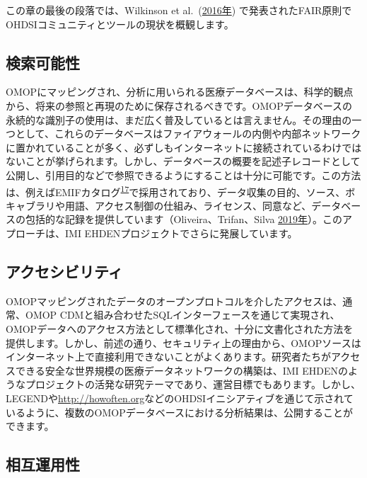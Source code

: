\documentclass[
  11pt]{book}
\theoremstyle{definition}
\theoremstyle{definition}
\theoremstyle{definition}
\theoremstyle{definition}
\theoremstyle{remark}
\begin{document}
この章の最後の段落では、Wilkinson et al.~(\href{https://ohdsi.github.io/TheBookOfOhdsi/OpenScience.html\#ref-wilkinson2016}{2016年}) で発表されたFAIR原則でOHDSIコミュニティとツールの現状を概観します。

\subsection{検索可能性}\label{ux691cux7d22ux53efux80fdux6027}

OMOPにマッピングされ、分析に用いられる医療データベースは、科学的観点から、将来の参照と再現のために保存されるべきです。OMOPデータベースの永続的な識別子の使用は、まだ広く普及しているとは言えません。その理由の一つとして、これらのデータベースはファイアウォールの内側や内部ネットワークに置かれていることが多く、必ずしもインターネットに接続されているわけではないことが挙げられます。しかし、データベースの概要を記述子レコードとして公開し、引用目的などで参照できるようにすることは十分に可能です。この方法は、例えばEMIFカタログ\textsuperscript{\href{https://ohdsi.github.io/TheBookOfOhdsi/OpenScience.html\#fn17}{17}}で採用されており、データ収集の目的、ソース、ボキャブラリや用語、アクセス制御の仕組み、ライセンス、同意など、データベースの包括的な記録を提供しています（Oliveira、Trifan、Silva \href{https://ohdsi.github.io/TheBookOfOhdsi/OpenScience.html\#ref-Oliveira2019}{2019年}）。このアプローチは、IMI EHDENプロジェクトでさらに発展しています。

\subsection{アクセシビリティ}\label{ux30a2ux30afux30bbux30b7ux30d3ux30eaux30c6ux30a3}

OMOPマッピングされたデータのオープンプロトコルを介したアクセスは、通常、OMOP CDMと組み合わせたSQLインターフェースを通じて実現され、OMOPデータへのアクセス方法として標準化され、十分に文書化された方法を提供します。しかし、前述の通り、セキュリティ上の理由から、OMOPソースはインターネット上で直接利用できないことがよくあります。研究者たちがアクセスできる安全な世界規模の医療データネットワークの構築は、IMI EHDENのようなプロジェクトの活発な研究テーマであり、運営目標でもあります。しかし、LEGENDや\href{http://howoften.org/}{http://howoften.org}などのOHDSIイニシアティブを通じて示されているように、複数のOMOPデータベースにおける分析結果は、公開することができます。

\subsection{相互運用性}\label{ux76f8ux4e92ux904bux7528ux6027}
\end{document}
